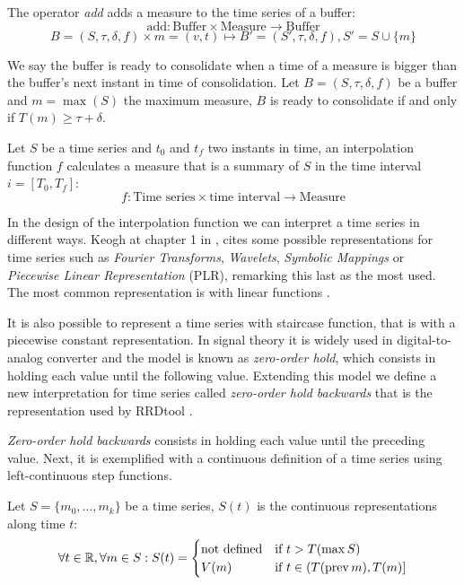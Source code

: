 \begin{definition}
  The operator \emph{add} adds a measure to the time series of a buffer:
  \[
  \text{add}: \text{Buffer} \times \text{Measure} \longrightarrow \text{Buffer}
  \]
  \[
   B = (S,\tau,\delta,f)  \times m = (v,t) \mapsto B'= (S',\tau,\delta,f),
   S' = S \cup \{m\}
   \] 
\end{definition}

\begin{definition}
  We say the buffer is ready to consolidate when a time of a measure
  is bigger than the buffer's next instant in time of consolidation.
  Let $B=(S,\tau,\delta,f)$ be a buffer and $m=\max(S)$ the maximum
  measure, $B$ is ready to consolidate if and only if $T(m) \geq
  \tau+\delta$.
\end{definition}

Let $S$ be a time series and $t_0$ and $t_f$ two instants in time, an
interpolation function $f$ calculates a measure that is a summary of
$S$ in the time interval $i=[T_0,T_f]$:
\[
f: \text{Time series} \times \text{time interval} \longrightarrow
\text{Measure}
\]


In the design of the interpolation function we can interpret a time
series in different ways. Keogh at chapter 1 in \cite{last}, cites
some possible representations for time series such as \emph{Fourier
  Transforms}, \emph{Wavelets}, \emph{Symbolic Mappings} or
\emph{Piecewise Linear Representation} (PLR), remarking this last as
the most used. The most common representation is with linear
functions \parencite{keogh01}.

It is also possible to represent a time series with staircase
function, that is with a piecewise constant representation. In signal
theory it is widely used in digital-to-analog converter and the model
is known as \emph{zero-order hold}, which consists in holding each
value until the following value. Extending this model we define a new
interpretation for time series called \emph{zero-order hold backwards}
that is the representation used by RRDtool \parencite{lisa98:oetiker}.

\emph{Zero-order hold backwards} consists in holding each value until
the preceding value. Next, it is exemplified with a continuous
definition of a time series using left-continuous step functions.

\begin{definition}
  Let $S=\{m_0,\ldots,m_k\}$ be a time series, $S(t)$ is the
  continuous representations along time $t$:
\[
\forall t \in \mathbb{R}  ,\forall m \in S:
S(t) =  
\begin{cases}
  \text{not defined} & \text{if } t > T(\max S) \\
  V(m) & \text{if }  t\in (T(\operatorname*{prev} m),T(m)]
\end{cases}
\]
\end{definition}


